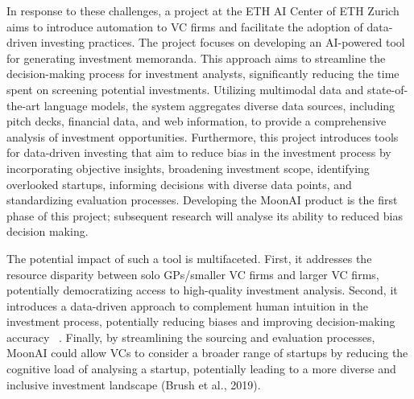 \documentclass[a4paper, oneside]{discothesis}
\begin{document}
In response to these challenges, a project at the ETH AI Center of ETH Zurich aims to introduce automation to VC firms and facilitate the adoption of data-driven investing practices. 
The project focuses on developing an AI-powered tool for generating investment memoranda. This approach aims to streamline the decision-making process for investment analysts, significantly reducing the time spent on screening potential investments. 
Utilizing multimodal data and state-of-the-art language models, the system aggregates diverse data sources, including pitch decks, financial data, and web information, to provide a comprehensive analysis of investment opportunities.
Furthermore, this project introduces tools for data-driven investing that aim to reduce bias in the investment process by incorporating objective insights, broadening investment scope, identifying overlooked startups, informing decisions with diverse data points, and standardizing evaluation processes. Developing the MoonAI product is the first phase of this project; subsequent research will analyse its ability to reduced bias decision making. 

The potential impact of such a tool is multifaceted. First, it addresses the resource disparity
between solo GPs/smaller VC firms and larger VC firms, potentially democratizing access to high-quality investment
analysis. Second, it introduces a data-driven approach to complement human intuition in the
investment process, potentially reducing biases and improving decision-making accuracy
~\cite{dellermann}. Finally, by streamlining the sourcing and evaluation processes, MoonAI
could allow VCs to consider a broader range of startups by reducing the cognitive load of analysing a startup, potentially leading to a more diverse
and inclusive investment landscape (Brush et al., 2019).
\end{document}
